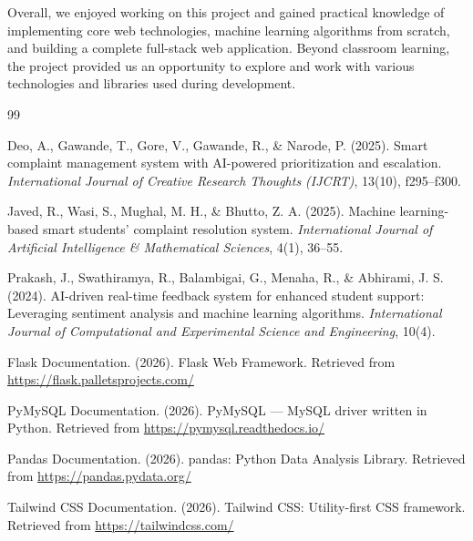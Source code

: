 \documentclass[12pt,a4paper]{report}
\begin{document}
Overall, we enjoyed working on this project and gained practical knowledge of implementing core web technologies, machine learning algorithms from scratch, and building a complete full-stack web application. Beyond classroom learning, the project provided us an opportunity to explore and work with various technologies and libraries used during development.

\begin{thebibliography}{99}

Deo, A., Gawande, T., Gore, V., Gawande, R., \& Narode, P. (2025). Smart complaint management system with AI-powered prioritization and escalation. \textit{International Journal of Creative Research Thoughts (IJCRT)}, 13(10), f295--f300.

Javed, R., Wasi, S., Mughal, M. H., \& Bhutto, Z. A. (2025). Machine learning-based smart students' complaint resolution system. \textit{International Journal of Artificial Intelligence \& Mathematical Sciences}, 4(1), 36--55.

Prakash, J., Swathiramya, R., Balambigai, G., Menaha, R., \& Abhirami, J. S. (2024). AI-driven real-time feedback system for enhanced student support: Leveraging sentiment analysis and machine learning algorithms. \textit{International Journal of Computational and Experimental Science and Engineering}, 10(4).

Flask Documentation. (2026). Flask Web Framework. Retrieved from \url{https://flask.palletsprojects.com/}

PyMySQL Documentation. (2026). PyMySQL — MySQL driver written in Python. Retrieved from \url{https://pymysql.readthedocs.io/}

Pandas Documentation. (2026). pandas: Python Data Analysis Library. Retrieved from \url{https://pandas.pydata.org/}

Tailwind CSS Documentation. (2026). Tailwind CSS: Utility-first CSS framework. Retrieved from \url{https://tailwindcss.com/}

\end{thebibliography}
\end{document}
